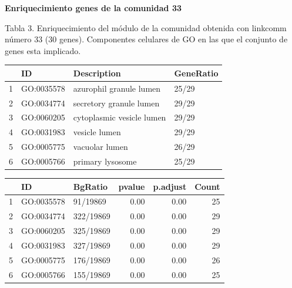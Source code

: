 \newpage

\textbf{Enriquecimiento genes de la comunidad 33}

 Tabla 3. Enriquecimiento del módulo de la comunidad obtenida con linkcomm número 33 (30 genes). Componentes celulares de GO en las que el conjunto de genes esta implicado.

\hfill

\begin{table}[ht]
\centering
\begin{tabular}{rlll}
  \hline
 & ID & Description & GeneRatio \\ 
  \hline
1 & GO:0035578 & azurophil granule lumen & 25/29 \\ 
  2 & GO:0034774 & secretory granule lumen & 29/29 \\ 
  3 & GO:0060205 & cytoplasmic vesicle lumen & 29/29 \\ 
  4 & GO:0031983 & vesicle lumen & 29/29 \\ 
  5 & GO:0005775 & vacuolar lumen & 26/29 \\ 
  6 & GO:0005766 & primary lysosome & 25/29 \\ 
   \hline
\end{tabular}
\end{table}

\begin{table}[ht]
\centering
\begin{tabular}{rllrrr}
  \hline
 & ID & BgRatio & pvalue & p.adjust & Count \\ 
  \hline
1 & GO:0035578 & 91/19869 & 0.00 & 0.00 &  25 \\ 
  2 & GO:0034774 & 322/19869 & 0.00 & 0.00 &  29 \\ 
  3 & GO:0060205 & 325/19869 & 0.00 & 0.00 &  29 \\ 
  4 & GO:0031983 & 327/19869 & 0.00 & 0.00 &  29 \\ 
  5 & GO:0005775 & 176/19869 & 0.00 & 0.00 &  26 \\ 
  6 & GO:0005766 & 155/19869 & 0.00 & 0.00 &  25 \\ 
   \hline
\end{tabular}
\end{table}

